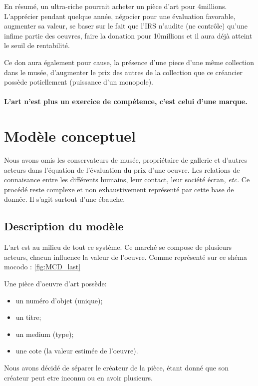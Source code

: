 \documentclass{article}
\begin{document}
        En résumé, un ultra-riche pourrait acheter un pièce d'art pour 4millions.
        L'apprécier pendant quelque année, négocier pour une évaluation favorable, augmenter sa valeur, se baser sur le fait que l'IRS n'audite (ne contrôle) qu'une infime partie des oeuvres, faire la donation pour 10millions et il aura déjà atteint le seuil de rentabilité.
        
        Ce don aura également pour cause, la présence d'une piece d'une même collection dans le musée, d'augmenter le prix des autres de la collection que ce créancier possède potiellement (puissance d'un monopole).

\paragraph{L'art n'est plus un exercice de compétence, c'est celui d'une marque.}


\section{Modèle conceptuel}


Nous avons omis les conservateurs de musée, propriétaire de gallerie et d'autres acteurs dans l'équation de l'évaluation du prix d'une oeuvre. 
Les relations de connaisance entre les différents humains, leur contact, leur société écran, \emph{etc.} 
Ce procédé reste complexe et non exhaustivement représenté par cette base de donnée.
Il s'agit surtout d'une ébauche.

\subsection{Description du modèle}

L'art est au milieu de tout ce système. 
Ce marché se compose de plusieurs acteurs, chacun influence la valeur de l'oeuvre.
Comme représenté sur ce shéma mocodo : \ref{fig:MCD_last}

Une pièce d'oeuvre d'art possède:
\begin{itemize}[label=\(\blacktriangleright\)]
    \item un numéro d'objet (unique);
    \item un titre;
    \item un medium (type);
    \item une cote (la valeur estimée de l'oeuvre).
\end{itemize}
Nous avons décidé de séparer le créateur de la pièce, étant donné que son créateur peut etre inconnu ou en avoir plusieurs.
\end{document}
